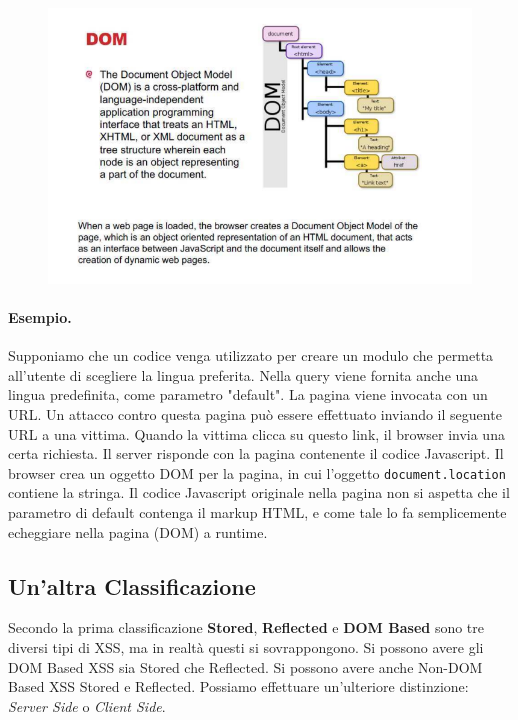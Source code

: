 \begin{figure}[H]
      \centering
      \includegraphics[width=\textwidth, keepaspectratio]{capitoli/secure_coding/img/cap_9/dom.png}
\end{figure}

\paragraph{Esempio.}
Supponiamo che un codice venga utilizzato per creare un modulo che permetta
all'utente di
scegliere la lingua preferita. Nella query viene fornita anche una lingua
predefinita, come
parametro "default".
La pagina viene invocata con un URL. Un attacco contro questa pagina può essere
effettuato inviando il seguente URL a una vittima. Quando la vittima clicca su
questo link, il
browser invia una certa richiesta. Il server risponde con la pagina contenente il
codice Javascript. Il browser crea un oggetto DOM per la pagina, in cui l'oggetto
\verb|document.location| contiene la stringa.
Il codice Javascript originale nella pagina non si aspetta che il parametro di
default contenga
il markup HTML, e come tale lo fa semplicemente echeggiare nella pagina (DOM) a
runtime.

\subsection{Un'altra Classificazione}

Secondo la prima classificazione \textbf{Stored}, \textbf{Reflected} e
\textbf{DOM Based} sono tre diversi tipi di XSS, ma in
realtà questi si sovrappongono. Si possono avere gli DOM Based XSS sia Stored che
Reflected. Si possono avere anche Non-DOM Based XSS Stored e Reflected.
Possiamo effettuare un'ulteriore distinzione: \textit{Server Side} o \textit{Client Side}.

